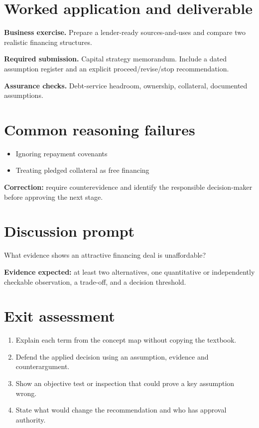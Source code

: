 \documentclass[11pt,letterpaper]{article}
\begin{document}
\section{Worked application and deliverable}
\textbf{Business exercise.} Prepare a lender-ready sources-and-uses and compare two realistic financing structures.\par\textbf{Required submission.} Capital strategy memorandum. Include a dated assumption register and an explicit proceed/revise/stop recommendation.\par\textbf{Assurance checks.} Debt-service headroom, ownership, collateral, documented assumptions.
\section{Common reasoning failures}
\begin{itemize}[leftmargin=*,itemsep=3pt]
\item Ignoring repayment covenants
\item Treating pledged collateral as free financing
\end{itemize}
\noindent\textbf{Correction:} require counterevidence and identify the responsible decision-maker before approving the next stage.
\section{Discussion prompt}
What evidence shows an attractive financing deal is unaffordable?\par\medskip\textbf{Evidence expected:} at least two alternatives, one quantitative or independently checkable observation, a trade-off, and a decision threshold.
\section{Exit assessment}
\begin{enumerate}[leftmargin=*,itemsep=5pt]
\item Explain each term from the concept map without copying the textbook.
\item Defend the applied decision using an assumption, evidence and counterargument.
\item Show an objective test or inspection that could prove a key assumption wrong.
\item State what would change the recommendation and who has approval authority.
\end{enumerate}

\end{document}
